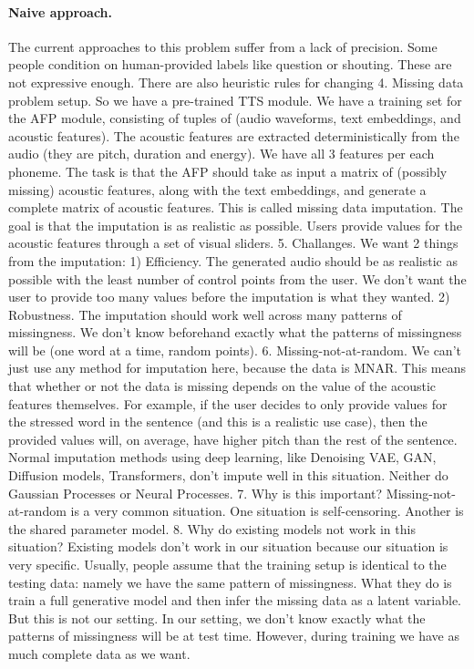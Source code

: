 \documentclass[a4paper,12pt,twoside,openright]{report}
\begin{document}
\paragraph{Naive approach.} The current approaches to this problem suffer from a lack of precision. Some people condition on human-provided labels like question or shouting. These are not expressive enough. There are also heuristic rules for changing
4. Missing data problem setup. So we have a pre-trained TTS module. We have a training set for the AFP module, consisting of tuples of (audio waveforms, text embeddings, and acoustic features). The acoustic features are extracted deterministically from the audio (they are pitch, duration and energy). We have all 3 features per each phoneme. The task is that the AFP should take as input a matrix of (possibly missing) acoustic features, along with the text embeddings, and generate a complete matrix of acoustic features. This is called missing data imputation. The goal is that the imputation is as realistic as possible. Users provide values for the acoustic features through a set of visual sliders.
5. Challanges. We want 2 things from the imputation: 1) Efficiency. The generated audio should be as realistic as possible with the least number of control points from the user. We don't want the user to provide too many values before the imputation is what they wanted. 2) Robustness. The imputation should work well across many patterns of missingness. We don't know beforehand exactly what the patterns of missingness will be (one word at a time, random points).
6. Missing-not-at-random. We can't just use any method for imputation here, because the data is MNAR. This means that whether or not the data is missing depends on the value of the acoustic features themselves. For example, if the user decides to only provide values for the stressed word in the sentence (and this is a realistic use case), then the provided values will, on average, have higher pitch than the rest of the sentence. Normal imputation methods using deep learning, like Denoising VAE, GAN, Diffusion models, Transformers, don't impute well in this situation. Neither do Gaussian Processes or Neural Processes.
7. Why is this important? Missing-not-at-random is a very common situation. One situation is self-censoring. Another is the shared parameter model.
8. Why do existing models not work in this situation? Existing models don't work in our situation because our situation is very specific. Usually, people assume that the training setup is identical to the testing data: namely we have the same pattern of missingness. What they do is train a full generative model and then infer the missing data as a latent variable. But this is not our setting. In our setting, we don't know exactly what the patterns of missingness will be at test time. However, during training we have as much complete data as we want. 
\end{document}
